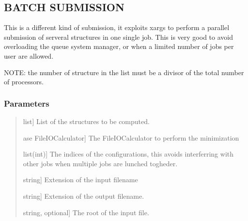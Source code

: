 \documentclass[a4paper,11pt,english]{sphinxmanual}
\begin{document}
\begin{fulllineitems}
\begin{fulllineitems}
\label{\detokenize{apireference:sscha.Cluster.Cluster.batch_submission}}
\pysigstartsignatures
{}
\pysigstopsignatures

\subsection{BATCH SUBMISSION}
\label{\detokenize{apireference:batch-submission}}
\sphinxAtStartPar
This is a different kind of submission, it exploits xargs to perform
a parallel submission of serveral structures in one single job.
This is very good to avoid overloading the queue system manager, or
when a limited number of jobs per user are allowed.

\sphinxAtStartPar
NOTE: the number of structure in the list must be a divisor of the
total number of processors.


\subsubsection{Parameters}
\label{\detokenize{apireference:id50}}\begin{quote}
\begin{description}
\sphinxlineitem{list\_of\_structures}{[}list{]}
\sphinxAtStartPar
List of the structures to be computed.

\sphinxlineitem{calc}{[}ase FileIOCalculator{]}
\sphinxAtStartPar
The FileIOCalculator to perform the minimization

\sphinxlineitem{indices}{[}list(int){]}
\sphinxAtStartPar
The indices of the configurations, this avoids interferring with
other jobs when multiple jobs are lunched togheder.

\sphinxlineitem{in\_extension}{[}string{]}
\sphinxAtStartPar
Extension of the input filename

\sphinxlineitem{out\_extension}{[}string{]}
\sphinxAtStartPar
Extension of the output filename.

\sphinxlineitem{label}{[}string, optional{]}
\sphinxAtStartPar
The root of the input file.


\end{description}
\end{quote}
\end{fulllineitems}
\end{fulllineitems}
\end{document}
